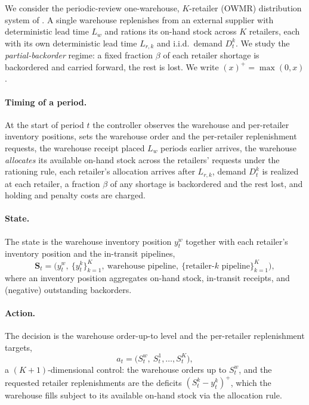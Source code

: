 \documentclass[11pt]{article}
\begin{document}
We consider the periodic-review one-warehouse, $K$-retailer (OWMR) distribution system of
\citet{kaynov2024owmr}. A single warehouse replenishes from an external supplier with deterministic
lead time $L_w$ and rations its on-hand stock across $K$ retailers, each with its own deterministic
lead time $L_{r,k}$ and i.i.d.\ demand $D^k_t$. We study the \emph{partial-backorder} regime: a fixed
fraction $\beta$ of each retailer shortage is backordered and carried forward, the rest is lost. We
write $(x)^+=\max(0,x)$.

\paragraph{Timing of a period.}
At the start of period $t$ the controller observes the warehouse and per-retailer inventory positions,
sets the warehouse order and the per-retailer replenishment requests, the warehouse receipt placed
$L_w$ periods earlier arrives, the warehouse \emph{allocates} its available on-hand stock across the
retailers' requests under the rationing rule, each retailer's allocation arrives after $L_{r,k}$,
demand $D^k_t$ is realized at each retailer, a fraction $\beta$ of any shortage is backordered and the
rest lost, and holding and penalty costs are charged.

\paragraph{State.}
The state is the warehouse inventory position $y^w_t$ together with each retailer's inventory
position and the in-transit pipelines,
\begin{equation*}
    \mathbf{S}_t=\bigl(y^w_t,\ \{y^k_t\}_{k=1}^{K},\ \text{warehouse pipeline},\ \{\text{retailer-}k\text{ pipeline}\}_{k=1}^{K}\bigr),
\end{equation*}
where an inventory position aggregates on-hand stock, in-transit receipts, and (negative) outstanding
backorders.

\paragraph{Action.}
The decision is the warehouse order-up-to level and the per-retailer replenishment targets,
\begin{equation*}
    a_t=\bigl(S^w_t,\ S^1_t,\dots,S^K_t\bigr),
\end{equation*}
a $(K{+}1)$-dimensional control: the warehouse orders up to $S^w_t$, and the requested retailer
replenishments are the deficits $(S^k_t-y^k_t)^+$, which the warehouse fills subject to its available
on-hand stock via the allocation rule.
\end{document}
